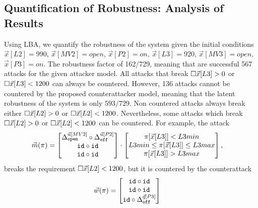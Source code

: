 {{\subsection{Quantification of Robustness: Analysis of Results}
Using LBA, we quantify the robustness of the system given the initial conditions $\vec{x}[L2]=990$, $\vec{x}[MV2]=open$, $\vec{x}[P2]=on$, $\vec{x}[L3]=920$, $\vec{x}[MV3]=open$, $\vec{x}[P3]=on$. The robustness factor of 162/729, meaning that are successful 567 attacks for the given attacker model. All attacks that break ${{\square}}{\vec{x}[L3]>0}$ or ${{\square}}{\vec{x}[L3]<1200}$ can always be countered. However, 136 attacks cannot be countered by the proposed counterattacker model, meaning that the latent robustness of the system is only $593/729$. Non countered attacks always break either ${{\square}}{\vec{x}[L2]>0}$ or ${{\square}}{\vec{x}[L2]<1200}$. Nevertheless, some attacks which break ${{\square}}{\vec{x}[L2]>0}$ or ${{\square}}{\vec{x}[L2]<1200}$ can be countered. For example, the attack
\begin{align*}
  \vec{m}(\pi)&=
  \begin{bmatrix}
   {\Delta}^{\vec{u}[MV2]}_{\texttt{open}}\circ {\Delta}^{\vec{u}[P2]}_{\texttt{off}} \\
   {\texttt{id}}\circ {\texttt{id}} \\
   {\texttt{id}}\circ {\texttt{id}} \\
  \end{bmatrix}
  \cdot
  \begin{bmatrix}
    \pi[\vec{x}[L3]]<L3min \\
    L3min \leq \pi[\vec{x}[L3]]\leq L3max \\
    \pi[\vec{x}[L3]]>L3max
  \end{bmatrix},
\end{align*} 
breaks the requirement ${{\square}}{\vec{x}[L2]<1200}$, but it is countered by the counterattack 
\begin{align*}
  \vec{w}(\pi)&=
  \begin{bmatrix}
    {\texttt{id}}\circ {\texttt{id}} \\
    {\texttt{id}}\circ {\texttt{id}} \\
    {\texttt{id}}\circ {\Delta}^{\vec{q}[P3]}_{\texttt{off}} \\

\end{bmatrix}
\end{align*}}}
